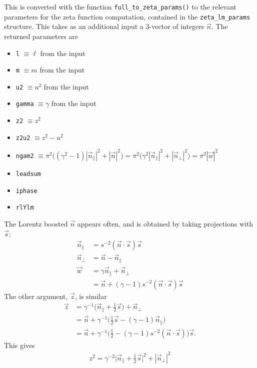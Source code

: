 \documentclass[a4paper]{article}
\begin{document}
This is converted with the function {\tt full\_to\_zeta\_params()}
 to the relevant parameters for the zeta function computation,
 contained in the {\tt zeta\_lm\_params} structure.
This takes as an additional input a 3-vector of integers $\vec{n}$.
The returned parameters are
\begin{itemize}
 \item {\tt l} $\equiv \ell$ from the input
 \item {\tt m} $\equiv m$ from the input
 \item {\tt u2} $\equiv u^2$ from the input
 \item {\tt gamma} $\equiv \gamma$ from the input
 \item {\tt z2} $\equiv z^2$
 \item {\tt z2u2} $\equiv z^2 - u^2$
 \item {\tt ngam2}
 $\equiv \pi^2 \Big( (\gamma^2-1) |\vec{n}_{\parallel}|^2 +|\vec{n}|^2 \Big)
 = \pi^2 \Big( \gamma^2|\vec{n}_{\parallel}|^2 +|\vec{n}_{\perp}|^2 \Big)
 = \pi^2 |\vec{w}|^{2}$
 \item {\tt leadsum}
 \item {\tt iphase}
 \item {\tt rlYlm}
\end{itemize}

The Lorentz boosted $\vec{n}$ appears often,
 and is obtained by taking projections with $\vec{s}$:
\begin{align}
 \vec{n}_{\parallel} &= s^{-2} (\vec{n}\cdot\vec{s}) \vec{s} \\
 \vec{n}_{\perp} &= \vec{n} - \vec{n}_{\parallel} \\
 \vec{w} &= \gamma \vec{n}_{\parallel} + \vec{n}_{\perp} \nonumber\\
         &= \vec{n} + (\gamma-1) s^{-2} (\vec{n}\cdot\vec{s}) \vec{s}
\end{align}
The other argument, $\vec{z}$, is similar
\begin{align}
 \vec{z}
 &= \gamma^{-1} \Big( \vec{n}_{\parallel} + \frac{1}{2} \vec{s} \Big) + \vec{n}_{\perp} \nonumber\\
 &= \vec{n} + \gamma^{-1} \Big(
  \frac{1}{2} \vec{s} - (\gamma-1) \vec{n}_{\parallel} \Big) \nonumber\\
 &= \vec{n} + \gamma^{-1} \Big(
  \frac{1}{2} - (\gamma-1) s^{-2} (\vec{n}\cdot\vec{s}) \Big) \vec{s}.
\end{align}
This gives
\begin{align}
 z^2 = \gamma^{-2} \Big| \vec{n}_{\parallel} + \frac{1}{2}\vec{s} \Big|^{2}
   + |\vec{n}_{\perp}|^{2}
\end{align}
\end{document}
